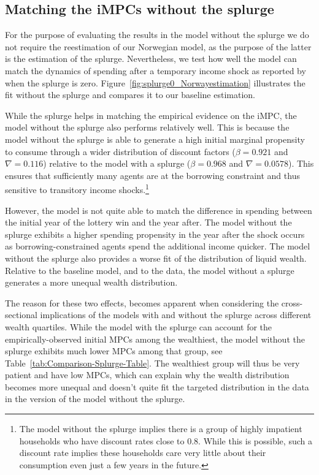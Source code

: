 \documentclass{econsocart}
\begin{document}
\subsection{Matching the iMPCs without the splurge}
\whenintegrated{\label{app:nosplurge-matching-impcs}} %

For the purpose of evaluating the results in the model without the splurge we do not require the reestimation of our Norwegian model, as the purpose of the latter is the estimation of the splurge. Nevertheless, we test how well the model can match the dynamics of spending after a temporary income shock as reported by~\cite{fagereng-mpc-2021} when the splurge is zero.
Figure~\ref{fig:splurge0_Norwayestimation} illustrates the fit without the splurge and compares it to our baseline estimation.



While the splurge helps in matching the empirical evidence on the iMPC, the model without the splurge also performs relatively well. This is because the model without the splurge is able to generate a high initial marginal propensity to consume through a wider distribution of discount factors ($\beta = 0.921$ and $\nabla=0.116$) relative to the model with a splurge ($\beta = 0.968$ and $\nabla=0.0578$). This ensures that sufficiently many agents are at the borrowing constraint and thus sensitive to transitory income shocks.\footnote{The model without the splurge implies there is a group of highly impatient households who have discount rates close to 0.8. While this is possible, such a discount rate implies these households care very little about their consumption even just a few years in the future.}

However, the model is not quite able to match the difference in spending between the initial year of the lottery win and the year after.
The model without the splurge exhibits a higher spending propensity in the year after the shock occurs as borrowing-constrained agents spend the additional income quicker.
The model without the splurge also provides a worse fit of the distribution of liquid wealth.
Relative to the baseline model, and to the data, the model without a splurge generates a more unequal wealth distribution.

The reason for these two effects, becomes apparent when considering the cross-sectional implications of the models with and without the splurge across different wealth quartiles.
While the model with the splurge can account for the empirically-observed initial MPCs among the wealthiest, the model without the splurge exhibits much lower MPCs among that group, see Table~\ref{tab:Comparison-Splurge-Table}. The wealthiest group will thus be very patient and have low MPCs, which can explain why the wealth distribution becomes more unequal and doesn't quite fit the targeted distribution in the data in the version of the model without the splurge.
\end{document}

